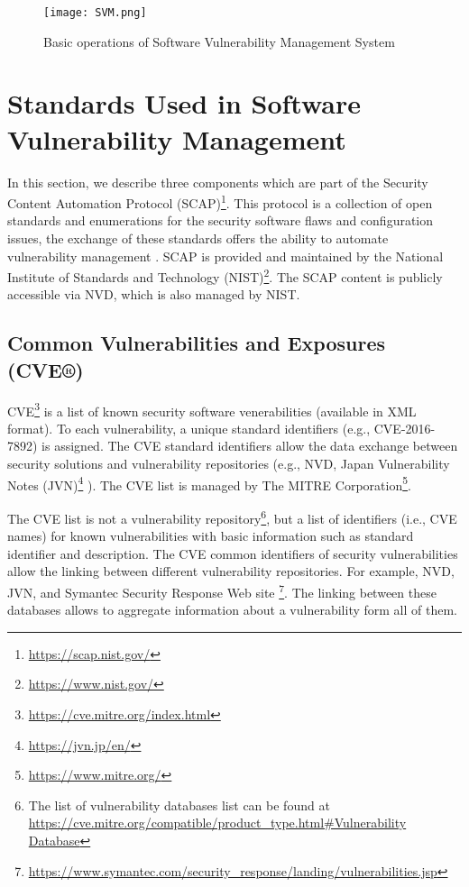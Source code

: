 \documentclass{llncs}
\begin{document}
\begin{figure}
 
  \centering
    \texttt{[image: SVM.png]}
     \caption{Basic operations of Software Vulnerability Management System}
\end{figure}

\section{Standards	Used	in	Software	Vulnerability	Management}
 
 In	this section, we describe three	components which are part of the Security	 Content	Automation	Protocol (SCAP)\footnote{\url{https://scap.nist.gov/}}. This protocol is a collection of open standards and enumerations for the	security  software flaws	 and configuration issues, the exchange of these	standards	offers	the	ability	to	automate	vulnerability	management \cite{scap_doc}.		
 SCAP is provided	and	maintained	by	the	National	Institute	of	Standards	and	Technology (NIST)\footnote{\url{https://www.nist.gov/}}. The SCAP	content	is	publicly accessible via  NVD, which is also managed	by NIST.
 
 
 \subsection{Common Vulnerabilities and Exposures (CVE®)} 
 CVE\footnote{\url{https://cve.mitre.org/index.html}} is a list of known security software venerabilities (available in XML format). To each vulnerability, a unique standard identifiers (e.g., CVE-2016-7892) is assigned. The CVE standard identifiers allow the data exchange between security solutions and vulnerability repositories (e.g., NVD, Japan Vulnerability Notes (JVN)\footnote{\url{https://jvn.jp/en/}} ). The CVE list is managed by The MITRE Corporation\footnote{\url{https://www.mitre.org/}}.

 The CVE list is not a vulnerability repository\footnote{The list of vulnerability databases list can be found at \url{https://cve.mitre.org/compatible/product_type.html\#Vulnerability Database}}, but a list of identifiers (i.e., CVE names) for  known vulnerabilities with basic information such as standard identifier and description. The CVE common identifiers of security vulnerabilities allow the linking between different vulnerability repositories. For example, NVD, JVN, and Symantec Security Response Web site \footnote{\url{https://www.symantec.com/security_response/landing/vulnerabilities.jsp}}. The linking between these databases allows to aggregate information about a vulnerability form all of them. 
 
\end{document}
